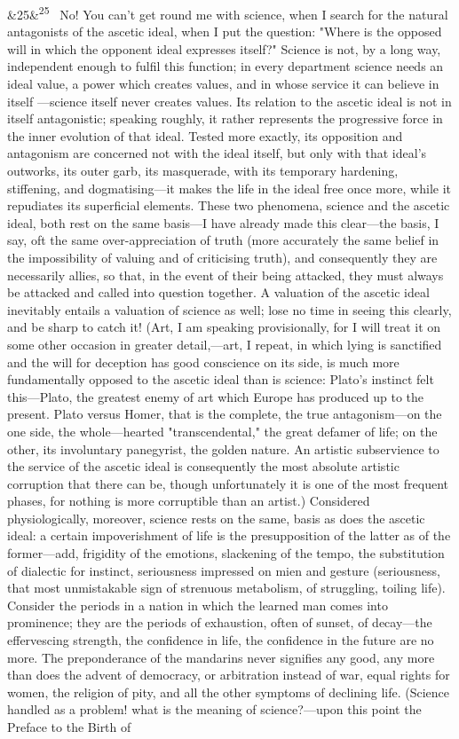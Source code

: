 \documentclass[12pt]{article}
\newcommand{\para}[1][]{\par\noindent\ifx&#1&\else\textsuperscript{\footnotesize #1}~\fi}
\begin{document}
\para[25] No! You can't get round me with science, when I search for the natural antagonists of the ascetic ideal, when I put the question: "Where is the opposed will in which the opponent ideal expresses itself?" Science is not, by a long way, independent enough to fulfil this function; in every department science needs an ideal value, a power which creates values, and in whose service it can believe in itself ---science itself never creates values. Its relation to the ascetic ideal is not in itself antagonistic; speaking roughly, it rather represents the progressive force in the inner evolution of that ideal. Tested more exactly, its opposition and antagonism are concerned not with the ideal itself, but only with that ideal's outworks, its outer garb, its masquerade, with its temporary hardening, stiffening, and dogmatising---it makes the life in the ideal free once more, while it repudiates its superficial elements. These two phenomena, science and the ascetic ideal, both rest on the same basis---I have already made this clear---the basis, I say, oft the same over-appreciation of truth (more accurately the same belief in the impossibility of valuing and of criticising truth), and consequently they are necessarily allies, so that, in the event of their being attacked, they must always be attacked and called into question together. A valuation of the ascetic ideal inevitably entails a valuation of science as well; lose no time in seeing this clearly, and be sharp to catch it! (Art, I am speaking provisionally, for I will treat it on some other occasion in greater detail,---art, I repeat, in which lying is sanctified and the will for deception has good conscience on its side, is much more fundamentally opposed to the ascetic ideal than is science: Plato's instinct felt this---Plato, the greatest enemy of art which Europe has produced up to the present. Plato versus Homer, that is the complete, the true antagonism---on the one side, the whole---hearted "transcendental," the great defamer of life; on the other, its involuntary panegyrist, the golden nature. An artistic subservience to the service of the ascetic ideal is consequently the most absolute artistic corruption that there can be, though unfortunately it is one of the most frequent phases, for nothing is more corruptible than an artist.) Considered physiologically, moreover, science rests on the same, basis as does the ascetic ideal: a certain impoverishment of life is the presupposition of the latter as of the former---add, frigidity of the emotions, slackening of the tempo, the substitution of dialectic for instinct, seriousness impressed on mien and gesture (seriousness, that most unmistakable sign of strenuous metabolism, of struggling, toiling life). Consider the periods in a nation in which the learned man comes into prominence; they are the periods of exhaustion, often of sunset, of decay---the effervescing strength, the confidence in life, the confidence in the future are no more. The preponderance of the mandarins never signifies any good, any more than does the advent of democracy, or arbitration instead of war, equal rights for women, the religion of pity, and all the other symptoms of declining life. (Science handled as a problem! what is the meaning of science?---upon this point the Preface to the Birth of 
\end{document}
